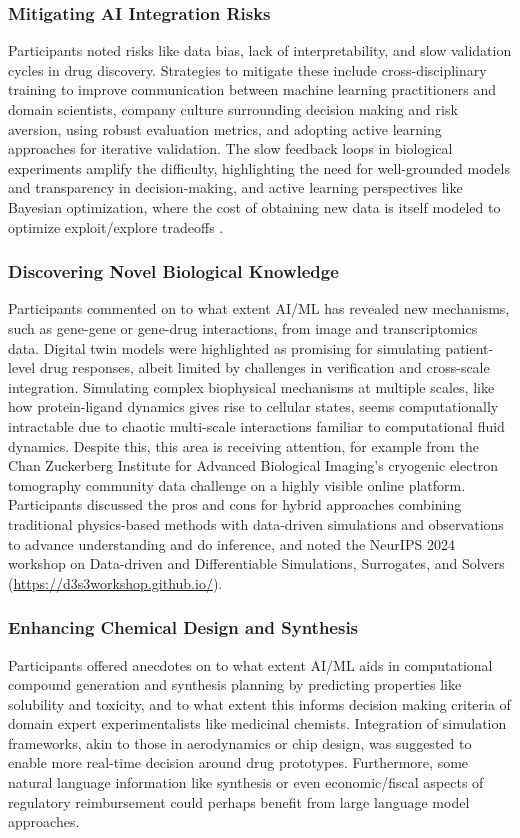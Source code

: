 \subsubsection{Mitigating AI Integration Risks}  
Participants noted risks like data bias, lack of interpretability, and slow validation cycles in drug discovery. Strategies to mitigate these include cross-disciplinary training to improve communication between machine learning practitioners and domain scientists, company culture surrounding decision making and risk aversion, using robust evaluation metrics, and adopting active learning approaches for iterative validation. The slow feedback loops in biological experiments amplify the difficulty, highlighting the need for well-grounded models and transparency in decision-making, and active learning perspectives like Bayesian optimization, where the cost of obtaining new data is itself modeled to optimize exploit/explore tradeoffs \citep{garnett_bayesoptbook_2022}.

\subsubsection{Discovering Novel Biological Knowledge} 
Participants commented on to what extent AI/ML has revealed new mechanisms, such as gene-gene or gene-drug interactions, from image and transcriptomics data. Digital twin models were highlighted as promising for simulating patient-level drug responses, albeit limited by challenges in verification and cross-scale integration. Simulating complex biophysical mechanisms at multiple scales, like how protein-ligand dynamics gives rise to cellular states, seems computationally intractable due to chaotic multi-scale interactions familiar to computational fluid dynamics. Despite this, this area is receiving attention, for example from the Chan Zuckerberg Institute for Advanced Biological Imaging's cryogenic electron tomography community data challenge \citep{Harrington2024} on a highly visible online platform. Participants discussed the pros and cons for hybrid approaches combining traditional physics-based methods with data-driven simulations and observations to advance understanding and do inference, and noted the NeurIPS 2024 workshop on Data-driven and Differentiable Simulations, Surrogates, and Solvers (\url{https://d3s3workshop.github.io/}).

\subsubsection{Enhancing Chemical Design and Synthesis}  
Participants offered anecdotes on to what extent AI/ML aids in computational compound generation and synthesis planning by predicting properties like solubility and toxicity, and to what extent this informs decision making criteria of domain expert experimentalists like medicinal chemists. Integration of simulation frameworks, akin to those in aerodynamics or chip design, was suggested to enable more real-time decision around drug prototypes. Furthermore, some natural language information like synthesis or even economic/fiscal aspects of regulatory reimbursement could perhaps benefit from large language model approaches.

